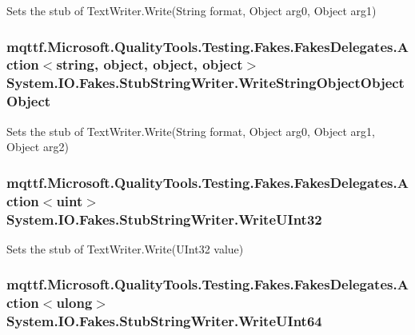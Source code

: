 Sets the stub of Text\-Writer.\-Write(\-String format, Object arg0, Object arg1)

\hypertarget{class_system_1_1_i_o_1_1_fakes_1_1_stub_string_writer_ab18d000d58e83ca9945c12dfc40b1634}{
\subsubsection[{Write\-String\-Object\-Object\-Object}]{\setlength{\rightskip}{0pt plus 5cm}mqttf.\-Microsoft.\-Quality\-Tools.\-Testing.\-Fakes.\-Fakes\-Delegates.\-Action$<$string, object, object, object$>$ System.\-I\-O.\-Fakes.\-Stub\-String\-Writer.\-Write\-String\-Object\-Object\-Object}}\label{class_system_1_1_i_o_1_1_fakes_1_1_stub_string_writer_ab18d000d58e83ca9945c12dfc40b1634}


Sets the stub of Text\-Writer.\-Write(\-String format, Object arg0, Object arg1, Object arg2)

\hypertarget{class_system_1_1_i_o_1_1_fakes_1_1_stub_string_writer_a396b34fc833c83ff2a1d8e68a0387a6f}{
\subsubsection[{Write\-U\-Int32}]{\setlength{\rightskip}{0pt plus 5cm}mqttf.\-Microsoft.\-Quality\-Tools.\-Testing.\-Fakes.\-Fakes\-Delegates.\-Action$<$uint$>$ System.\-I\-O.\-Fakes.\-Stub\-String\-Writer.\-Write\-U\-Int32}}\label{class_system_1_1_i_o_1_1_fakes_1_1_stub_string_writer_a396b34fc833c83ff2a1d8e68a0387a6f}


Sets the stub of Text\-Writer.\-Write(\-U\-Int32 value)

\hypertarget{class_system_1_1_i_o_1_1_fakes_1_1_stub_string_writer_a78a056362f60eebdab37075b85d0f7da}{
\subsubsection[{Write\-U\-Int64}]{\setlength{\rightskip}{0pt plus 5cm}mqttf.\-Microsoft.\-Quality\-Tools.\-Testing.\-Fakes.\-Fakes\-Delegates.\-Action$<$ulong$>$ System.\-I\-O.\-Fakes.\-Stub\-String\-Writer.\-Write\-U\-Int64}}\label{class_system_1_1_i_o_1_1_fakes_1_1_stub_string_writer_a78a056362f60eebdab37075b85d0f7da}


